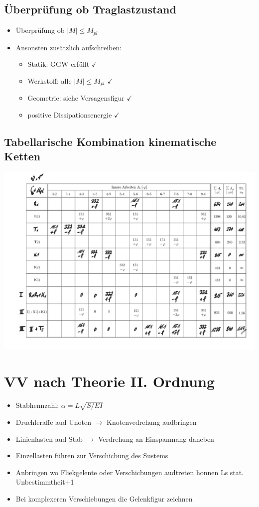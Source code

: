 \documentclass[fleqn,twoside]{article}
\newcommand{\abs}[1]{\ensuremath{\left\vert#1\right\vert}}
\begin{document}
    \subsection{Überprüfung ob Traglastzustand}
        \begin{itemize}
            \item Überprüfung ob $\abs{M} \leq M_{pl}$
            \item Ansonsten zusätzlich aufschreiben:
                \begin{itemize}
                    \item Statik: GGW erfüllt $\checkmark$
                    \item Werkstoff: alle $\abs{M} \leq M_{pl}$ $\checkmark$
                    \item Geometrie: siehe Versagensfigur $\checkmark$
                    \item positive Dissipationsenergie $\checkmark$
                \end{itemize}
        \end{itemize}
    \subsection{Tabellarische Kombination kinematische Ketten}
        \includegraphics[scale = 0.55]{Grafiken/KombinationElementarketten.pdf}

\section{VV nach Theorie II. Ordnung}
    \begin{itemize}
        \item Stabhennzahl: $\alpha= L \sqrt{S/EI}$
        \item Druchleraffe aud Unoten $\rightarrow$ Knotenvedrehung audbringen
        \item Linienlasten aud Stab $\rightarrow$ Verdrehung an Einspanmang daneben
        \item Einzellasten führen zur Verschicbung des Sustems
        \item Anbringen wo Fliekgelente oder Verschicbungen audtreten honnen Ls stat. Unbestimmtheit+1
        \item Bei komplexeren Verschiebungen die Gelenkfigur zeichnen
    \end{itemize}
\end{document}

